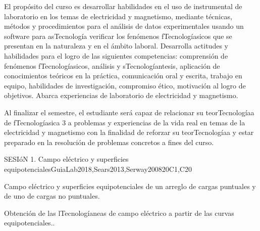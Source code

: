 \begin{syllabus}


\begin{justification}
El propósito del curso es desarrollar habilidades en el uso de instrumental de laboratorio en los temas de electricidad y magnetismo, mediante técnicas, métodos y procedimientos para el análisis de datos experimentales usando un software para asTecnología verificar los fenómenos fTecnologíasicos que se presentan en la naturaleza y en el ámbito laboral. Desarrolla actitudes y habilidades para el logro de las siguientes competencias: comprensión de fenómenos fTecnologíasicos, análisis y sTecnologíantesis, aplicación de conocimientos teóricos en la práctica, comunicación oral y escrita, trabajo en equipo, habilidades de investigación, compromiso ético, motivación al logro de objetivos. Abarca experiencias de laboratorio de electricidad y magnetismo. 
\end{justification}

\begin{goals}
\item Al finalizar el semestre, el estudiante será capaz de relacionar su teorTecnologíaa de fTecnologíasica 3 a problemas y experiencias de la vida real en temas de la electricidad y magnetismo con la finalidad de reforzar su teorTecnologíaa y estar preparado en la resolución de problemas concretos a fines del curso.
\end{goals}

\begin{outcomes}
\item {}
\item {}
\end{outcomes}

\begin{competences}
    \item {}
\end{competences}

\begin{unit}{SESIóN 1. Campo eléctrico y superficies equipotenciales}{}{GuiaLab2018,Sears2013,Serway2008}{20}{C1,C20}
\begin{topics}
      \item Campo eléctrico y superficies equipotenciales de un arreglo de cargas puntuales y de uno de cargas no puntuales.
      \item Obtención de las lTecnologíaneas de campo eléctrico a partir de las curvas equipotenciales..
\end{topics}
\end{unit}


\end{syllabus}
